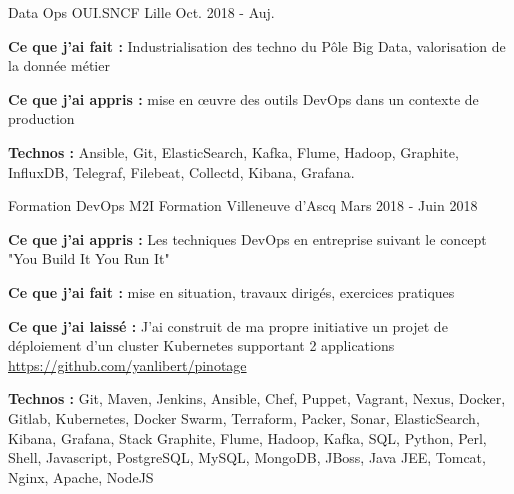 

\begin{cventries}

  \cventry
    {Data Ops} %
    {OUI.SNCF} %
    {Lille} %
    {Oct. 2018 - Auj.} %
    {
      \begin{cvitems} %
        \item {\textbf{Ce que j'ai fait :} Industrialisation des techno du Pôle Big Data, valorisation de la donnée métier}
        \item {\textbf{Ce que j'ai appris :} mise en \oe uvre des outils DevOps dans un contexte de production}
        \item {\textbf{Technos :} Ansible, Git, ElasticSearch, Kafka, Flume, Hadoop, Graphite, InfluxDB, Telegraf, Filebeat, Collectd, Kibana, Grafana.}
      \end{cvitems}
    }

  \cventry
    {Formation DevOps} %
    {M2I Formation} %
    {Villeneuve d'Ascq} %
    {Mars 2018 - Juin 2018} %
    {
      \begin{cvitems} %
        \item {\textbf{Ce que j'ai appris :} Les techniques DevOps en entreprise suivant le concept "You Build It You Run It"}
        \item {\textbf{Ce que j'ai fait :} mise en situation, travaux dirigés, exercices pratiques}
        \item {\textbf{Ce que j'ai laissé :} J'ai construit de ma propre initiative un projet de déploiement d'un cluster Kubernetes supportant 2 applications \url{https://github.com/yanlibert/pinotage} }
        \item {\textbf{Technos :} Git, Maven, Jenkins, Ansible, Chef, Puppet, Vagrant, Nexus, Docker, Gitlab, Kubernetes, Docker Swarm, Terraform, Packer, Sonar, ElasticSearch, Kibana, Grafana, Stack Graphite, Flume, Hadoop, Kafka, SQL, Python, Perl, Shell, Javascript, PostgreSQL, MySQL, MongoDB, JBoss, Java JEE, Tomcat, Nginx, Apache, NodeJS}
      \end{cvitems}
    }


\end{cventries}
